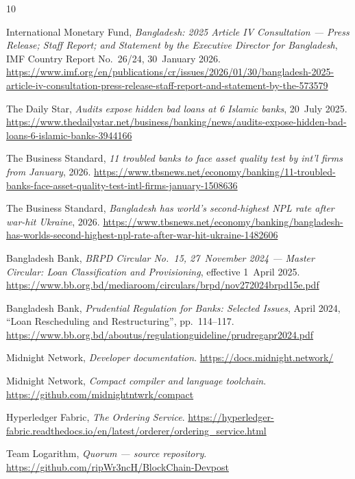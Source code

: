 \documentclass[11pt,a4paper]{article}
\begin{document}
\begin{thebibliography}{10}
\small

International Monetary Fund, \emph{Bangladesh: 2025 Article IV Consultation --- Press Release; Staff
Report; and Statement by the Executive Director for Bangladesh}, IMF Country Report No.~26/24,
30~January 2026.
\url{https://www.imf.org/en/publications/cr/issues/2026/01/30/bangladesh-2025-article-iv-consultation-press-release-staff-report-and-statement-by-the-573579}

The Daily Star, \emph{Audits expose hidden bad loans at 6 Islamic banks}, 20~July 2025.
\url{https://www.thedailystar.net/business/banking/news/audits-expose-hidden-bad-loans-6-islamic-banks-3944166}

The Business Standard, \emph{11 troubled banks to face asset quality test by int'l firms from January},
2026.
\url{https://www.tbsnews.net/economy/banking/11-troubled-banks-face-asset-quality-test-intl-firms-january-1508636}

The Business Standard, \emph{Bangladesh has world's second-highest NPL rate after war-hit Ukraine}, 2026.
\url{https://www.tbsnews.net/economy/banking/bangladesh-has-worlds-second-highest-npl-rate-after-war-hit-ukraine-1482606}

Bangladesh Bank, \emph{BRPD Circular No.~15, 27~November 2024 --- Master Circular: Loan Classification and
Provisioning}, effective 1~April 2025.
\url{https://www.bb.org.bd/mediaroom/circulars/brpd/nov272024brpd15e.pdf}

Bangladesh Bank, \emph{Prudential Regulation for Banks: Selected Issues}, April 2024, ``Loan Rescheduling
and Restructuring'', pp.~114--117.
\url{https://www.bb.org.bd/aboutus/regulationguideline/prudregapr2024.pdf}

Midnight Network, \emph{Developer documentation}. \url{https://docs.midnight.network/}

Midnight Network, \emph{Compact compiler and language toolchain}.
\url{https://github.com/midnightntwrk/compact}

Hyperledger Fabric, \emph{The Ordering Service}.
\url{https://hyperledger-fabric.readthedocs.io/en/latest/orderer/ordering_service.html}

Team Logarithm, \emph{Quorum --- source repository}.
\url{https://github.com/ripWr3ncH/BlockChain-Devpost}

\end{thebibliography}
\end{document}

